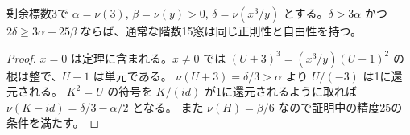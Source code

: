 \begin{corollary}
剰余標数3で $\alpha=\nu(3)$, $\beta=\nu(y)>0$,
$\delta=\nu(x^3/y)$ とする。$\delta>3\alpha$ かつ
$2\delta\ge3\alpha+25\beta$ ならば、通常な階数15窓は同じ正則性と自由性を持つ。
\end{corollary}
\begin{proof}
$x=0$ は定理に含まれる。$x\ne0$ では
$(U+3)^3=(x^3/y)(U-1)^2$ の根は整で、$U-1$ は単元である。
$\nu(U+3)=\delta/3>\alpha$ より $U/(-3)$ は1に還元される。
$K^2=U$ の符号を $K/(id)$ が1に還元されるように取れば
$\nu(K-id)=\delta/3-\alpha/2$ となる。
また $\nu(H)=\beta/6$ なので証明中の精度25の条件を満たす。
\end{proof}
